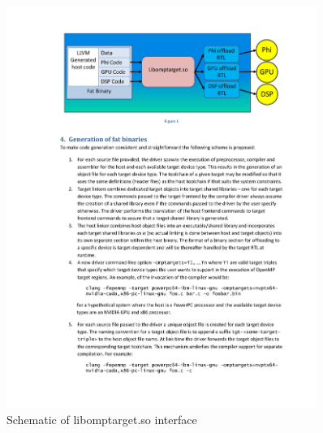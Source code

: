 \begin{figure}
  \centering
  \includegraphics[width=0.9\textwidth]{ImageLibomptarget.pdf}
  \caption{Schematic of libomptarget.so interface}
  \label{fg:libomptarget_schematic}
\end{figure}
